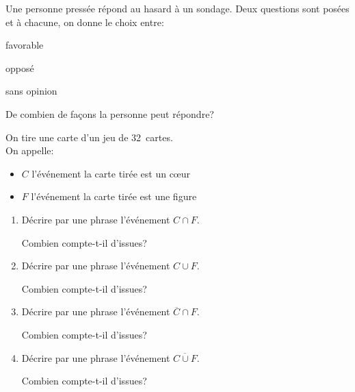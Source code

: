  \begin{exercice}
     Une personne pressée répond au hasard à un sondage. Deux questions sont 
 posées et à chacune, on donne le choix entre:
 \begin{colitemize}{2}
 \item favorable
 \item opposé
 \item sans opinion
 \end{colitemize}
     De combien de façons la personne peut répondre?
 \end{exercice}
 

\begin{exercice}
On tire une carte d'un jeu de 32~cartes. \\On appelle:
\begin{itemize}
\item $C$ l'événement \og la carte tirée est un c\oe ur\fg
\item $F$ l'événement \og la carte tirée est une figure\fg 
\end{itemize}
\vspace{-1.5em}
\begin{enumerate}
 \item Décrire par une phrase l'événement $C\cap F$.

 Combien compte-t-il d'issues?
 
 \item Décrire par une phrase l'événement $C\cup F$.
 
 Combien compte-t-il d'issues?
 \item  Décrire par une phrase l'événement $\overline{C}\cap F$. 
 
 Combien compte-t-il d'issues?
  \item  Décrire par une phrase l'événement $\overline{C\cup F}$. 
 
 Combien compte-t-il d'issues?
\end{enumerate}
\end{exercice}

